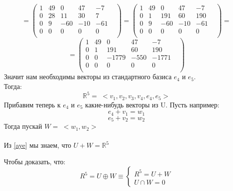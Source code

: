\documentclass[a4paper,12pt]{article}
\begin{document}
\[
=
\begin{pmatrix}
1 & 49 & 0 & 47 & -7 & \\
0 & 28 & 11 & 30 & 7 & \\
0 & 9 & -60 & -10 & -61 & \\
0 & 0 & 0 & 0 & 0 & \\
\end{pmatrix}
=
\begin{pmatrix}
1 & 49 & 0 & 47 & -7 & \\
0 & 1 & 191 & 60 & 190 & \\
0 & 9 & -60 & -10 & -61 & \\
0 & 0 & 0 & 0 & 0 & \\
\end{pmatrix}
=
\]
\[
=
\begin{pmatrix}
1 & 49 & 0 & 47 & -7 & \\
0 & 1 & 191 & 60 & 190 & \\
0 & 0 & -1779 & -550 & -1771 & \\
0 & 0 & 0 & 0 & 0 & \\
\end{pmatrix}
\]
Значит нам необходимы векторы из стандартного базиса $e_4$ и $e_5$.
\\
Тогда:
\begin{equation} \label{aye}
\mathbb{R}^5 = \;<v_1, v_2, v_3, v_4, e_4, e_5>
\end{equation}
Прибавим теперь к $e_4$ и $e_5$ какие-нибудь векторы из U. Пусть например:
\[
e_4 + v_1 = w_1
\]
\[
e_5 + v_2 = w_2
\]
Тогда пускай $W = \; <w_1, w_2>$
\\\\
Из \ref{aye} мы знаем, что $U + W = \mathbb{R}^5$ 

Чтобы доказать, что:
\[
R^5 = U \oplus W \equiv  \begin{cases}
R^5 =U  + W \\
U \cap W = 0
\end{cases}
\]
\end{document}
